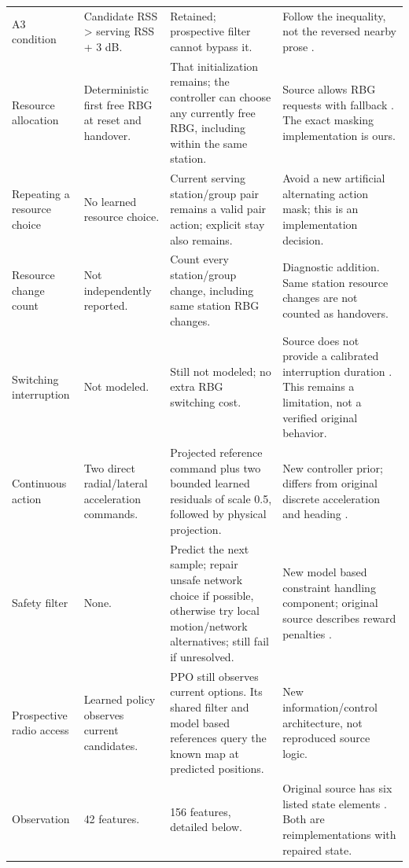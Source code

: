 {\begin{longtable}{@{}p{}p{}p{}p{}@{}}
A3 condition & Candidate RSS > serving RSS + 3 dB. & Retained; prospective filter cannot bypass it. & Follow the inequality, not the reversed nearby prose \cite[p. 9, Eq. (3); p. 15, Table 3]{thesis}.\\
Resource allocation & Deterministic first free RBG at reset and handover. & That initialization remains; the controller can choose any currently free RBG, including within the same station. & Source allows RBG requests with fallback \cite[p. 9, Sec. 3.3.1]{thesis}. The exact masking implementation is ours.\\
Repeating a resource choice & No learned resource choice. & Current serving station/group pair remains a valid pair action; explicit stay also remains. & Avoid a new artificial alternating action mask; this is an implementation decision.\\
Resource change count & Not independently reported. & Count every station/group change, including same station RBG changes. & Diagnostic addition. Same station resource changes are not counted as handovers.\\
Switching interruption & Not modeled. & Still not modeled; no extra RBG switching cost. & Source does not provide a calibrated interruption duration \cite[p. 9, Sec. 3.3.1; p. 15, Table 3]{thesis}. This remains a limitation, not a verified original behavior.\\
Continuous action & Two direct radial/lateral acceleration commands. & Projected reference command plus two bounded learned residuals of scale 0.5, followed by physical projection. & New controller prior; differs from original discrete acceleration and heading \cite[p. 12, Sec. 5.2; p. 15, Table 3]{thesis}.\\
Safety filter & None. & Predict the next sample; repair unsafe network choice if possible, otherwise try local motion/network alternatives; still fail if unresolved. & New model based constraint handling component; original source describes reward penalties \cite[p. 12, Eq. (14)]{thesis}.\\
Prospective radio access & Learned policy observes current candidates. & PPO still observes current options. Its shared filter and model based references query the known map at predicted positions. & New information/control architecture, not reproduced source logic.\\
Observation & 42 features. & 156 features, detailed below. & Original source has six listed state elements \cite[p. 12, Sec. 5.2]{thesis}. Both are reimplementations with repaired state.\\

\end{longtable}}
